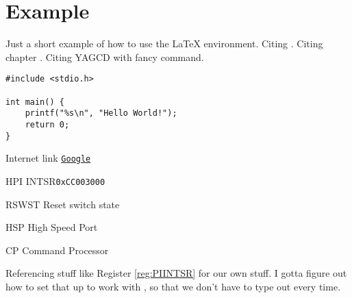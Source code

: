 \chapter{Example}

Just a short example of how to use the \LaTeX{} environment. Citing \cite{DolphinDSP}. Citing chapter \YAGCD[5]{}.
Citing YAGCD \YAGCD{} with fancy command.

\begin{codebox}
    \begin{verbatim}     
#include <stdio.h>

int main() {
    printf("%s\n", "Hello World!");
    return 0;
}
    \end{verbatim}
\end{codebox}

\noindent Internet link \href{http://www.google.com}{\texttt{Google}}

\begin{register}{H}{PI INTSR}{\texttt{0xCC003000}}
    \label{reg:PIINTSR}
    \regnewline
    \begin{regdesc}\begin{reglist}
        \item [RSWST] Reset switch state
        \item [HSP] High Speed Port
        \item [CP] Command Processor
    \end{reglist}\end{regdesc}
\end{register}
Referencing stuff like Register \ref{reg:PIINTSR} for our own stuff. I gotta figure out how to set that up to work with \texttt{\Cref}, so that we don't have to type out  every time.